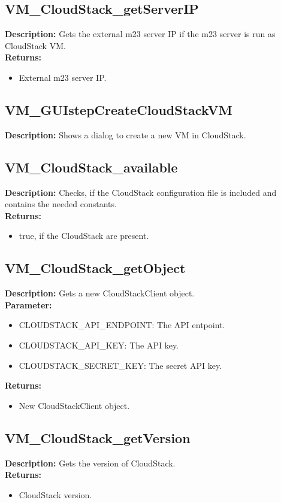 \subsection{VM\_CloudStack\_getServerIP}
\textbf{Description:} Gets the external m23 server IP if the m23 server is run as CloudStack VM.\\
\textbf{Returns:}
\begin{itemize}
\item External m23 server IP.
\end{itemize}

\subsection{VM\_GUIstepCreateCloudStackVM}
\textbf{Description:} Shows a dialog to create a new VM in CloudStack.\\

\subsection{VM\_CloudStack\_available}
\textbf{Description:} Checks, if the CloudStack configuration file is included and contains the needed constants.\\
\textbf{Returns:}
\begin{itemize}
\item true, if the CloudStack are present.
\end{itemize}

\subsection{VM\_CloudStack\_getObject}
\textbf{Description:} Gets a new CloudStackClient object.\\
\textbf{Parameter:}
\begin{itemize}
\item CLOUDSTACK\_API\_ENDPOINT: The API entpoint.
\item CLOUDSTACK\_API\_KEY: The API key.
\item CLOUDSTACK\_SECRET\_KEY: The secret API key.
\end{itemize}
\textbf{Returns:}
\begin{itemize}
\item New CloudStackClient object.
\end{itemize}

\subsection{VM\_CloudStack\_getVersion}
\textbf{Description:} Gets the version of CloudStack.\\
\textbf{Returns:}
\begin{itemize}
\item CloudStack version.
\end{itemize}

